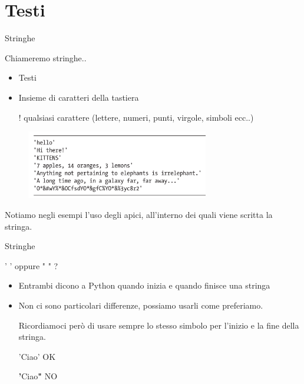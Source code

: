 \section{Testi}

\begin{frame}{Stringhe}
	\begin{block}{Chiameremo stringhe..}
        \begin{itemize}
            \item Testi
            \item Insieme di caratteri della tastiera
            
            ! qualsiasi carattere (lettere, numeri, punti, virgole, simboli ecc..)
        \end{itemize}

        \begin{figure}
            \includegraphics[height=3cm]{images/esempio_stringhe.png}
        \end{figure}
	\end{block}
	
	Notiamo negli esempi l'uso degli apici, all'interno dei quali viene scritta la stringa.
\end{frame}

\begin{frame}{Stringhe}
	\begin{block}{' ' oppure " " ?}
        \begin{itemize}
            \item Entrambi dicono a Python quando inizia e quando finisce una stringa
            \item Non ci sono particolari differenze, possiamo usarli come preferiamo.
            
            Ricordiamoci però di usare sempre lo stesso simbolo per l'inizio e la fine della stringa.
            
            'Ciao' OK
            
            \textbf{'}Ciao\textbf{"} NO
        \end{itemize}
	\end{block}
\end{frame}

